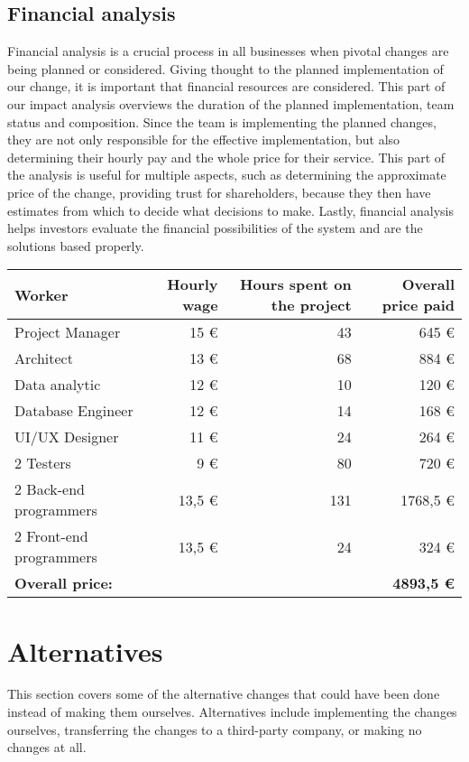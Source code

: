 \documentclass[11pt,a4paper]{article}
\begin{document}
\subsection{Financial analysis}
Financial analysis is a crucial process in all businesses when pivotal changes are being planned or considered. Giving thought to the planned implementation of our change, it is important that financial resources are considered. This part of our impact analysis overviews the duration of the planned implementation, team status and composition. Since the team is implementing the planned changes, they are not only responsible for the effective implementation, but also determining their hourly pay and the whole price for their service. This part of the analysis is useful for multiple aspects, such as determining the approximate price of the change, providing trust for shareholders, because they then have estimates from which to decide what decisions to make. Lastly, financial analysis helps investors evaluate the financial possibilities of the system and are the solutions based properly.
\newpage %
\begin{table}[h!]
    \centering
    \begin{tabular}{lrrr}
        \toprule
        Worker & Hourly wage & Hours spent on the project & Overall price paid \\
        \midrule
        Project Manager & 15 € & 43 & 645 € \\
        Architect & 13 € & 68 & 884 € \\
        Data analytic & 12 € & 10 & 120 € \\
        Database Engineer & 12 € & 14 & 168 € \\
        UI/UX Designer & 11 € & 24 & 264 € \\
        2 Testers & 9 € & 80 & 720 € \\
        2 Back-end programmers & 13,5 € & 131 & 1768,5 € \\
        2 Front-end programmers & 13,5 € & 24 & 324 € \\
        \midrule
        \textbf{Overall price:} & & & \textbf{4893,5 €} \\
        \bottomrule
    \end{tabular}
\end{table}


\section{Alternatives}
This section covers some of the alternative changes that could have been done instead of making them ourselves. Alternatives include implementing the changes ourselves, transferring the changes to a third-party company, or making no changes at all.
\end{document}
